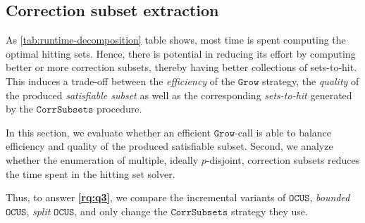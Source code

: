 \documentclass[twoside,11pt]{article}
\newcommand\comment[1]{\marginpar{\tiny #1}}
\renewcommand\comment[1]{#1}
\newcommand{\tias}[1]{{\comment{\color{blue}Tias:#1}}}
\newcommand\mm[1]{\ensuremath{#1}\xspace}
\newcommand\call[1]{\mm{\texttt{#1}}}
\newcommand\grow{\mm{\call{Grow}}}
\newcommand\comus{\mm{\call{OCUS}}}
\newcommand\corrsubsets{\mm{\call{CorrSubsets}}}
\newcommand\maxsat{\texttt{MaxSAT}}
\begin{document}
\subsection{Correction subset extraction}
	As \cref{tab:runtime-decomposition} table shows, most time is spent computing the optimal hitting sets. Hence, there is potential in reducing its effort by computing better or more correction subsets, thereby having better collections of sets-to-hit.
This induces a trade-off between the \emph{efficiency} of the \grow strategy, the \emph{quality} of the produced \emph{satisfiable subset} as well as the corresponding \emph{sets-to-hit} generated by the \corrsubsets procedure. 



In this section, we evaluate whether an efficient \grow-call is able to balance efficiency and quality of the produced satisfiable subset. Second, we analyze whether the enumeration of multiple, ideally $p$-disjoint, correction subsets 
reduces the time spent in the hitting set solver.

Thus, to answer \textbf{\ref{rq:q3}}, we compare the incremental variants of \comus, \emph{bounded} \comus, \emph{split} \comus, and only change the \corrsubsets strategy they use.  
\end{document}
